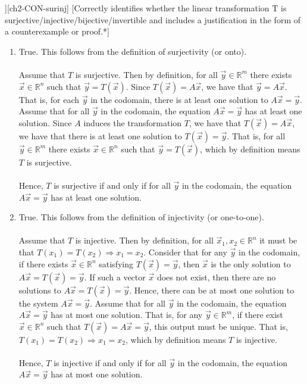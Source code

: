\begin{SaveQuestion}
{\begin{enumerate}
        \end{enumerate}}
][ch2-CON-surinj]
    [Correctly identifies whether the linear transformation T is surjective/injective/bijective/invertible and includes a justification in the form of a counterexample or proof.*]
    \begin{enumerate}
	\item True. This follows from the definition of surjectivity (or onto). \\ \\
        Assume that $T$ is surjective. Then by definition, for all $\vec y \in \mathbb{R}^m$ there exists $\vec x \in \mathbb{R}^n$ such that $\vec y = T(\vec x)$. Since $T(\vec x) = A\vec x$, we have that $\vec y = A\vec x$. That is, for each $\vec y$ in the codomain, there is at least one solution to $A \vec x = \vec y$. 
        Assume that for all $\vec y$ in the codomain, the equation $A \vec x = \vec y$ has at least one solution. Since $A$ induces the transformation $T$, we have that $T(\vec x) = A\vec x$, we have that there is at least one solution to $T(\vec x) = \vec y$. That is, for all $\vec y \in \mathbb{R}^m$ there exists $\vec x \in \mathbb{R}^n$ such that $\vec y = T(\vec x)$, which by definition means $T$ is surjective. \\ \\
        Hence, $T$ is surjective if and only if for all $\vec y$ in the codomain, the equation $A \vec x = \vec y$ has at least one solution.
        
        \item True. This follows from the definition of injectivity (or one-to-one). \\ \\
        Assume that $T$ is injective. Then by definition, for all $\vec x_1, x_2 \in \mathbb{R}^n$ it must be that $T(x_1) = T(x_2) \Longrightarrow x_1 = x_2$. Consider that for any $\vec y$ in the codomain, if there exists $\vec x \in \mathbb{R}^n$ satisfying $T(\vec x) = \vec y$, then $\vec x$ is the only solution to $A \vec x = T(\vec x) = \vec y$. If such a vector $\vec x$ does not exist, then there are no solutions to $A \vec x = T(\vec x) = \vec y$. Hence, there can be at most one solution to the system $A \vec x = \vec y$. 
        Assume that for all $\vec y$ in the codomain, the equation $A\vec x = \vec y$ has at most one solution. That is, for any $\vec y \in \mathbb{R}^m$, if there exist $\vec x \in \mathbb{R}^n$ such that $T(\vec x) = A\vec x = \vec y$, this output must be unique. That is, $T(x_1) = T(x_2) \Longrightarrow x_1 = x_2$, which by definition means $T$ is injective. \\ \\
        Hence, $T$ is injective if and only if for all $\vec y$ in the codomain, the equation $A\vec x = \vec y$ has at most one solution.
        

\end{enumerate}
\end{SaveQuestion}
